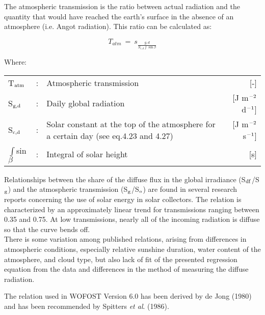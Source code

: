 \documentclass[11pt]{report}
\begin{document}
The atmospheric transmission is the ratio between actual radiation and the quantity that
would have reached the earth's surface in the absence of an atmosphere (i.e. Angot
radiation). This ratio can be calculated as:

\begin{equation}
T _{atm} ~=~ s _{\frac{g,d}{S _{c,d} \int \sin \beta }}
\end{equation}

Where:\\
\begin{tabularx}{\textwidth}{llXr}
T$_{{\rm atm}}$ &:& Atmospheric transmission  & [-]\\
S$_{{\rm g,d}}$ &:& Daily global radiation  & [J m$^{{\rm -2}}$ d$^{{\rm -1}}$]\\
S$_{{\rm c,d}}$ &:& Solar constant at the top of the atmosphere for a certain day (see eq.4.23 and 4.27)  & [J m$^{{\rm -2}}$ s$^{{\rm -1}}$]\\
$\int$sin$\beta$  &:& Integral of solar height   & [s]\\
\end{tabularx}

Relationships between the share of the diffuse flux in the global irradiance (S$_{{\rm df}}$/S$_{{\rm g}}$) and the atmospheric transmission (S$_{{\rm g}}$/S$_{{\rm o}}$) are found in several research reports concerning the use
of solar energy in solar collectors. The relation is characterized by an approximately
linear trend for transmissions ranging between 0.35 and 0.75. At low transmissions,
nearly all of the incoming radiation is diffuse so that the curve bends off.\\
There is some variation among published relations, arising from differences in atmos\-pheric conditions, especially relative sunshine duration, water content of the atmosphere,
and cloud type, but also lack of fit of the presented regression equation from the data and
differences in the method of measuring the diffuse radiation.

The relation used in WOFOST Version 6.0 has been derived by de Jong (1980) and has
been recommended by Spitters {\it et al\/}. (1986).

\end{document}
